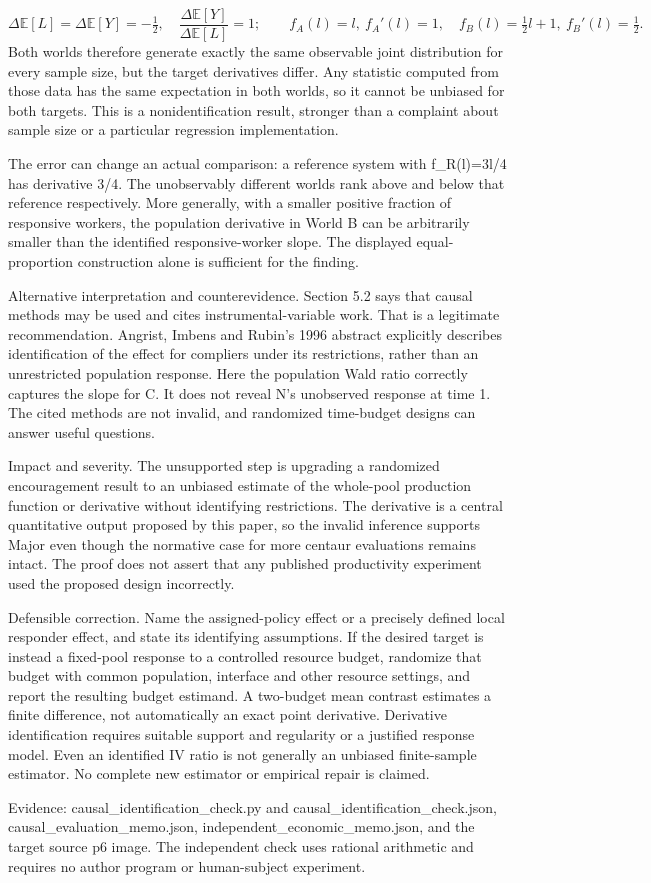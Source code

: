 \documentclass[10pt]{article}
\begin{document}
\[\Delta\mathbb E[L]=\Delta\mathbb E[Y]=-\tfrac12,\quad \frac{\Delta\mathbb E[Y]}{\Delta\mathbb E[L]}=1;\qquad f_A(l)=l,\ f_A'(l)=1,\quad f_B(l)=\tfrac12l+1,\ f_B'(l)=\tfrac12.\] Both worlds therefore generate exactly the same observable joint distribution for every sample size, but the target derivatives differ. Any statistic computed from those data has the same expectation in both worlds, so it cannot be unbiased for both targets. This is a nonidentification result, stronger than a complaint about sample size or a particular regression implementation.\par
The error can change an actual comparison: a reference system with f\_R(l)=3l/4 has derivative 3/4. The unobservably different worlds rank above and below that reference respectively. More generally, with a smaller positive fraction of responsive workers, the population derivative in World B can be arbitrarily smaller than the identified responsive-worker slope. The displayed equal-proportion construction alone is sufficient for the finding.\par
Alternative interpretation and counterevidence. Section 5.2 says that causal methods may be used and cites instrumental-variable work. That is a legitimate recommendation. Angrist, Imbens and Rubin’s 1996 abstract explicitly describes identification of the effect for compliers under its restrictions, rather than an unrestricted population response. Here the population Wald ratio correctly captures the slope for C. It does not reveal N’s unobserved response at time 1. The cited methods are not invalid, and randomized time-budget designs can answer useful questions.\par
Impact and severity. The unsupported step is upgrading a randomized encouragement result to an unbiased estimate of the whole-pool production function or derivative without identifying restrictions. The derivative is a central quantitative output proposed by this paper, so the invalid inference supports Major even though the normative case for more centaur evaluations remains intact. The proof does not assert that any published productivity experiment used the proposed design incorrectly.\par
Defensible correction. Name the assigned-policy effect or a precisely defined local responder effect, and state its identifying assumptions. If the desired target is instead a fixed-pool response to a controlled resource budget, randomize that budget with common population, interface and other resource settings, and report the resulting budget estimand. A two-budget mean contrast estimates a finite difference, not automatically an exact point derivative. Derivative identification requires suitable support and regularity or a justified response model. Even an identified IV ratio is not generally an unbiased finite-sample estimator. No complete new estimator or empirical repair is claimed.\par
Evidence: causal\_identification\_check.py and causal\_identification\_check.json, causal\_evaluation\_memo.json, independent\_economic\_memo.json, and the target source p6 image. The independent check uses rational arithmetic and requires no author program or human-subject experiment.\par
\end{document}
